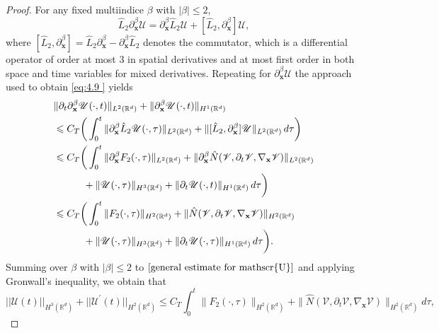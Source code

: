 \documentclass[11pt,reqno,oneside]{amsart}
\numberwithin{equation}{section}
\theoremstyle{definition}
\theoremstyle{remark}
\numberwithin{equation}{section}
\begin{document}
\begin{proof}
		For any fixed multiindice $\beta$ with $|\beta|\leqslant 2$, 
		$$
		\hat{L}_2\partial_{\mathbf{x}}^{\beta}\mathscr{U}=\partial_{\mathbf{x}}^{\beta}\hat{L}_2\mathscr{U}+[\hat{L}_2,\partial_\mathbf{x}^\beta]\mathscr{U},
		$$
		where $[\hat{L}_2,\partial_\mathbf{x}^\beta] = \hat{L}_2\partial_\mathbf{x}^\beta - \partial_\mathbf{x}^\beta \hat{L}_2$ denotes the commutator, 
		which is a differential operator of order at most 3 in spatial derivatives 
		and at most first order in both space and time variables for mixed derivatives. Repeating for $\partial_\mathbf{x}^{\beta} \mathscr{U}$ the approach used to obtain \eqref{eq:4.9 } yields
		\begin{equation}\label{general estimate for mathscr{U}}
			\begin{aligned}
				&\|\partial_{t}\partial_\mathbf{x}^\beta \mathscr{U}(\cdot,t)\|_{L^2(\mathbb{R}^d)} + \|\partial^{\beta}_{\mathbf{x}}\mathscr{U}(\cdot,t)\|_{H^1(\mathbb{R}^d)}\\
				&\leqslant C_T\bigg( \int_{0}^{t} \|\partial_{\mathbf{x}}^{\beta}\hat{L}_2 \mathscr{U}(\cdot,\tau)\|_{L^2(\mathbb{R}^d)} + \|[\hat{L}_2,\partial_\mathbf{x}^\beta]\mathscr{U}\|_{L^2(\mathbb{R}^d)}\, d\tau \bigg)\\
				&\leqslant  C_T\bigg(\int_{0}^{t} \|\partial_{\mathbf{x}}^{\beta}F_2(\cdot,\tau)\|_{L^2(\mathbb{R}^d)} +\|\partial_{\mathbf{x}}^{\beta}\hat{N}(\mathscr{V},\partial_{t}\mathscr{V},\nabla_\mathbf{x}\mathscr{V})\|_{L^2(\mathbb{R}^d)}\\
				&\quad \quad\quad+\| \mathscr{U}(\cdot,\tau)\|_{H^{3}(\mathbb{R}^d)}+\|\partial_{t} \mathscr{U}(\cdot,t)\|_{H^1(\mathbb{R}^d)}\, d\tau \bigg)\\
				& \leqslant  C_T\bigg(\int_{0}^{t} \|F_2(\cdot,\tau)\|_{H^2(\mathbb{R}^d)}+\|\hat{N}(\mathscr{V},\partial_{t}\mathscr{V},\nabla_\mathbf{x}\mathscr{V})\|_{H^2(\mathbb{R}^d)}\\
				&\quad \quad\quad+\| \mathscr{U}(\cdot,\tau)\|_{H^{3}(\mathbb{R}^d)}+\|\partial_{t} \mathscr{U}(\cdot,\tau)\|_{H^1(\mathbb{R}^d)}\, d\tau \bigg).
			\end{aligned}
		\end{equation}
		Summing over $\beta$ with $|\beta| \leqslant 2$ to $\eqref{general estimate for mathscr{U}}$ and applying Gronwall's inequality, we obtain that
		\begin{equation}\label{5.10}
			||\mathscr{U}(t)||_{H^{3}(\mathbb{R}^d)}+||\mathscr{U}^{\prime}(t)||_{H^{2}(\mathbb{R}^d)} \leqslant C_T\int_{0}^{t} \|F_2(\cdot,\tau)\|_{H^2(\mathbb{R}^d)} +\|\hat{N}(\mathscr{V},\partial_{t}\mathscr{V},\nabla_\mathbf{x}\mathscr{V})\|_{H^2(\mathbb{R}^d)}d\tau ,

\end{equation}
\end{proof}
\end{document}
